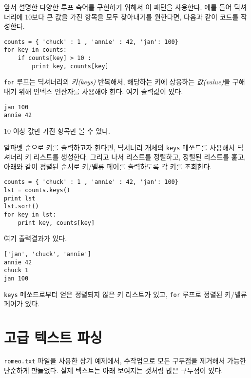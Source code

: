 
앞서 설명한 다양한 루프 숙어를 구현하기 위해서 이 패턴을 사용한다. 예를 들어 딕셔너리에 10보다 큰 값을 가진 항목을 모두 찾아내기를 원한다면,
다음과 같이 코드를 작성한다.

\beforeverb
\begin{verbatim}
counts = { 'chuck' : 1 , 'annie' : 42, 'jan': 100}
for key in counts:
    if counts[key] > 10 :
        print key, counts[key]
\end{verbatim}
\afterverb
%

{\tt for} 루프는 딕셔너리의 {\em 키(keys)} 반복해서, 해당하는 키에 상응하는 {\em 값(value)}을 구해내기 위해 인덱스 연산자를 사용해야 한다.
여기 출력값이 있다.

\beforeverb
\begin{verbatim}
jan 100
annie 42
\end{verbatim}
\afterverb
%

10 이상 값만 가진 항목만 볼 수 있다.


알파벳 순으로 키를 출력하고자 한다면, 딕셔너리 개체의 {\tt keys} 메쏘드를 사용해서 딕셔너리 키 리스트를 생성한다.
그리고 나서 리스트를 정렬하고, 정렬된 리스트를 훑고, 아래와 같이 정렬된 순서로 키/밸류 페어를 출력하도록 각 키를 조회한다.

\beforeverb
\begin{verbatim}
counts = { 'chuck' : 1 , 'annie' : 42, 'jan': 100}
lst = counts.keys()
print lst
lst.sort()
for key in lst:
    print key, counts[key]
\end{verbatim}
\afterverb
%

여기 출력결과가 있다.

\beforeverb
\begin{verbatim}
['jan', 'chuck', 'annie']
annie 42
chuck 1
jan 100
\end{verbatim}
\afterverb
%

{\tt keys} 메쏘드로부터 얻은 정렬되지 않은 키 리스트가 있고, 
{\tt for} 루프로 정렬된 키/밸류 페어가 있다.

\section{고급 텍스트 파싱}


{\tt romeo.txt} 파일을 사용한 상기 예제에서, 수작업으로 모든 구두점을 제거해서 가능한 단순하게 만들었다.
실제 텍스트는 아래 보여지는 것처럼 많은 구두점이 있다.


